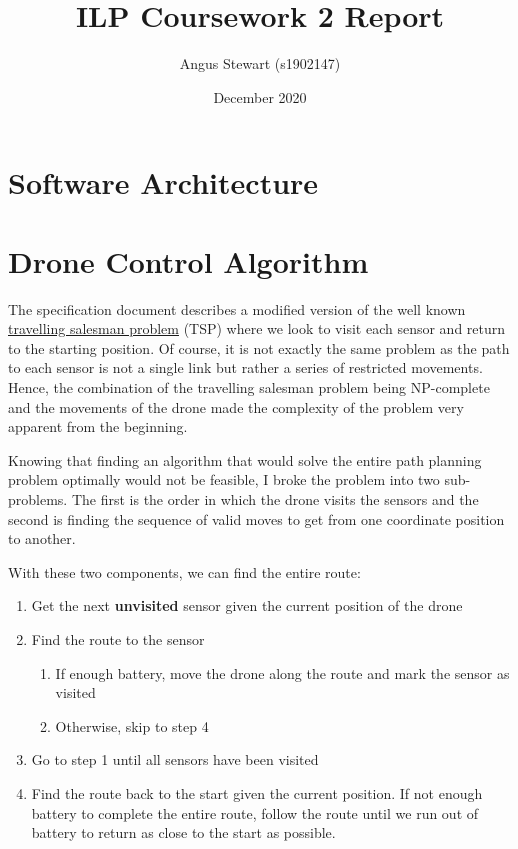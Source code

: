 \documentclass[11pt]{article}
\title{ILP Coursework 2 Report}
\author{Angus Stewart (s1902147)}
\date{December 2020}
\begin{document}
\maketitle

\tableofcontents

\newpage
{}

\section{Software Architecture}

\newpage

\section{Drone Control Algorithm}
The specification document describes a modified version of the well known \href{https://en.wikipedia.org/wiki/Travelling\_salesman\_problem}{travelling salesman problem} (TSP) where we look to visit each sensor and return to the starting position. Of course, it is not exactly the same problem as the path to each sensor is not a single link but rather a series of restricted movements. Hence, the combination of the travelling salesman problem being NP-complete and the movements of the drone made the complexity of the problem very apparent from the beginning.

Knowing that finding an algorithm that would solve the entire path planning problem optimally would not be feasible, I broke the problem into two sub-problems. The first is the order in which the drone visits the sensors and the second is finding the sequence of valid moves to get from one coordinate position to another.

With these two components, we can find the entire route:
\begin{enumerate}[topsep=0pt, itemsep=0pt]
    \item Get the next \textbf{unvisited} sensor given the current position of the drone
    \item Find the route to the sensor
    \begin{enumerate}[topsep=0pt, itemsep=0pt]
        \item If enough battery, move the drone along the route and mark the sensor as visited
        \item Otherwise, skip to step 4
    \end{enumerate}
    \item Go to step 1 until all sensors have been visited
    \item Find the route back to the start given the current position. If not enough battery to complete the entire route, follow the route until we run out of battery to return as close to the start as possible.
\end{enumerate}
\end{document}
